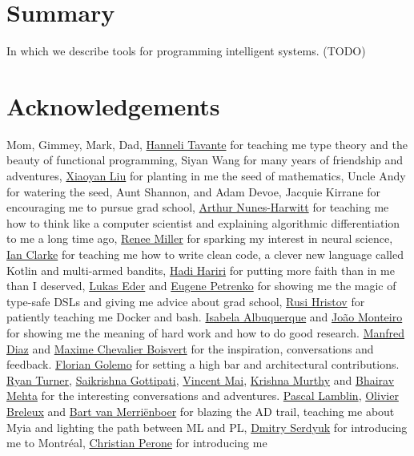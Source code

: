 \documentclass[12pt,initial,twoside,maitrise]{dms}
\numberwithin{equation}{section}
\numberwithin{table}{chapter}
\numberwithin{figure}{chapter}
\begin{document}

\chapter*{Summary}

In which we describe tools for programming intelligent systems. (TODO)

\chapter*{Acknowledgements}

Mom, Gimmey, Mark, Dad, \href{http://hannelita.com/}{Hanneli Tavante} for teaching me type theory and the beauty of functional programming, Siyan Wang for many years of friendship and adventures, \href{https://laverne.edu/directory/person/xiaoyan-liu/}{Xiaoyan Liu} for planting in me the seed of mathematics, Uncle Andy for watering the seed, Aunt Shannon, and Adam Devoe, Jacquie Kirrane for encouraging me to pursue grad school, \href{https://www.cs.rit.edu/~anh/}{Arthur Nunes-Harwitt} for teaching me how to think like a computer scientist and explaining algorithmic differentiation to me a long time ago, \href{http://www.sas.rochester.edu/bcs/people/faculty/miller_renee/index.html}{Renee Miller} for sparking my interest in neural science, \href{http://blog.locut.us}{Ian Clarke} for teaching me how to write clean code, a clever new language called Kotlin and multi-armed bandits, \href{https://hadihariri.com/}{Hadi Hariri} for putting more faith than in me than I deserved, \href{http://www.jooq.org/}{Lukas Eder} and \href{https://jonnyzzz.com/}{Eugene Petrenko} for showing me the magic of type-safe DSLs and giving me advice about grad school, \href{https://github.com/rusi}{Rusi Hristov} for patiently teaching me Docker and bash. \href{https://scholar.google.ca/citations?user=-Ss9QGkAAAAJ}{Isabela Albuquerque} and \href{https://scholar.google.ca/citations?user=hkO47vsAAAAJ}{Jo\~ao Monteiro} for showing me the meaning of hard work and how to do good research. \href{https://takeitallsource.github.io}{Manfred Diaz} and \href{https://pointersgonewild.com/}{Maxime Chevalier Boisvert} for the inspiration, conversations and feedback. \href{https://fgolemo.github.io/}{Florian Golemo} for setting a high bar and architectural contributions. \href{http://TurnerComputing.com}{Ryan Turner}, \href{https://saikrishna-1996.github.io}{Saikrishna Gottipati}, \href{http://maivincent.github.io}{Vincent Mai}, \href{https://krrish94.github.io/}{Krishna Murthy} and \href{https://bhairavmehta95.github.io/}{Bhairav Mehta} for the interesting conversations and adventures. \href{https://scholar.google.ca/citations?user=bn4xHHIAAAAJ}{Pascal Lamblin}, \href{http://breuleux.net}{Olivier Breleux} and \href{https://scholar.google.ca/citations?user=XE9SDzgAAAAJ}{Bart van Merri\"enboer} for blazing the AD trail, teaching me about Myia and lighting the path between ML and PL, \href{https://scholar.google.ca/citations?user=PsKlNzUAAAAJ}{Dmitry Serdyuk} for introducing me to Montr\'eal, \href{http://christianperone.com}{Christian Perone} for introducing me 
\end{document}
